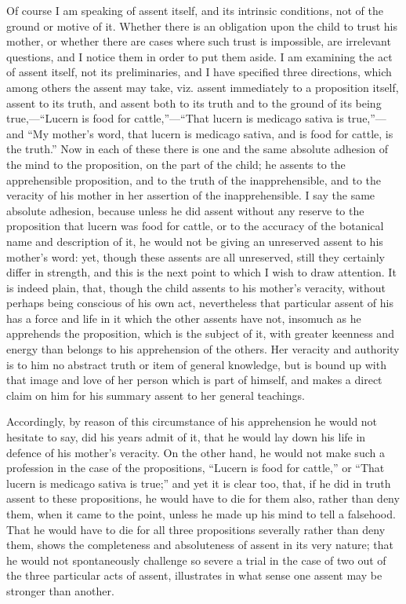 Of course I am speaking of assent itself, and its intrinsic
conditions, not of the ground or motive of it. Whether there is an
obligation upon the child to trust his mother, or whether there are
cases where such trust is impossible, are irrelevant questions, and I
notice them in order to put them aside. I am examining the act of
assent itself, not its preliminaries, and I have specified three
directions, which among others the assent may take, viz. assent
immediately to a proposition itself, assent to its truth, and assent
both to its truth and to the ground of its being true,—``Lucern
is food for cattle,''—``That lucern is medicago sativa is
true,''—and ``My mother's word, that lucern is medicago
sativa, and is food for cattle, is the truth.'' Now in each of
these there is one and the same absolute adhesion of the mind to the
proposition, on the part of the child; he assents to the apprehensible
proposition, and to the truth of the inapprehensible, and to the
veracity of his mother in her assertion of the inapprehensible. I say
the same absolute adhesion, because unless he did assent without any
reserve to the proposition that lucern was food for cattle, or to the
accuracy of the botanical name and description of it, he would not be
giving an unreserved assent to his mother's word: yet, though these assents are all unreserved, still they certainly differ in
strength, and this is the next point to which I wish to draw
attention. It is indeed plain, that, though the child assents to his
mother's veracity, without perhaps being conscious of his own act,
nevertheless that particular assent of his has a force and life in it
which the other assents have not, insomuch as he apprehends the
proposition, which is the subject of it, with greater keenness and
energy than belongs to his apprehension of the others. Her veracity
and authority is to him no abstract truth or item of general
knowledge, but is bound up with that image and love of her person
which is part of himself, and makes a direct claim on him for his
summary assent to her general teachings.

Accordingly, by reason of this circumstance of his apprehension he
would not hesitate to say, did his years admit of it, that he would
lay down his life in defence of his mother's veracity. On the other
hand, he would not make such a profession in the case of the
propositions, ``Lucern is food for cattle,'' or ``That
lucern is medicago sativa is true;'' and yet it is clear too,
that, if he did in truth assent to these propositions, he would have
to die for them also, rather than deny them, when it came to the
point, unless he made up his mind to tell a falsehood. That he would
have to die for all three propositions severally rather than deny
them, shows the completeness and absoluteness of assent in its very
nature; that he would not spontaneously challenge so severe a trial in
the case of two out of the three particular acts of assent,
illustrates in what sense one assent may be stronger than another.


